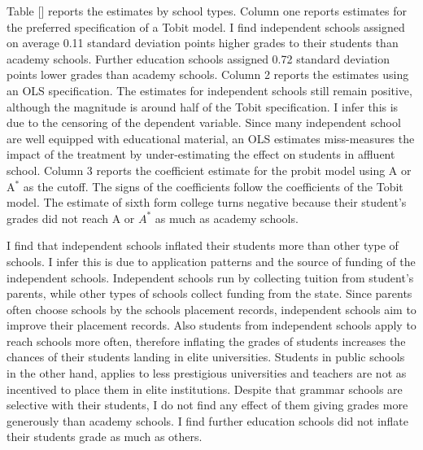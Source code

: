 Table [] reports the estimates by school types. Column one reports estimates for the preferred specification of a Tobit model. I find independent schools assigned on average 0.11 standard deviation points higher grades to their students than academy schools. Further education schools assigned 0.72 standard deviation points lower grades than academy schools. Column 2 reports the estimates using an OLS specification. The estimates for independent schools still remain positive, although the magnitude is around half of the Tobit specification. I infer this is due to the censoring of the dependent variable. Since many independent school are well equipped with educational material, an OLS estimates miss-measures the impact of the treatment by under-estimating the effect on students in affluent school. Column 3 reports the coefficient estimate for the probit model using A or A$^*$ as the cutoff. The signs of the coefficients follow the coefficients of the Tobit model. The estimate of sixth form college turns negative because their student's grades did not reach A or $A^*$ as much as academy schools. 

I find that independent schools inflated their students more than other type of schools. I infer this is due to application patterns and the source of funding of the independent schools. Independent schools run by collecting tuition from student's parents, while other types of schools collect funding from the state. Since parents often choose schools by the schools placement records, independent schools aim to improve their placement records. Also students from independent schools apply to reach schools more often, therefore inflating the grades of students increases the chances of their students landing in elite universities. Students in public schools in the other hand, applies to less prestigious universities and teachers are not as incentived to place them in elite institutions. Despite that grammar schools are selective with their students, I do not find any effect of them giving grades more generously than academy schools. I find further education schools did not inflate their students grade as much as others. 

